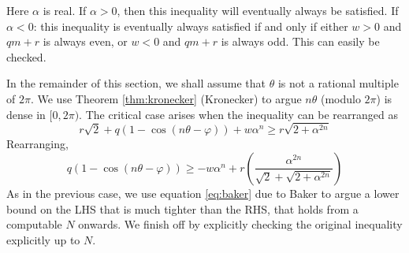 Here $\alpha$ is real. If $\alpha > 0$, then this inequality will eventually always be satisfied. If $\alpha < 0$: this inequality is eventually always satisfied if and only if either $w>0$ and $qm+r$ is always even, or $w<0$ and $qm+r$ is always odd. This can easily be checked.

In the remainder of this section, we shall assume that $\theta$ is not a rational multiple of $2\pi$. We use Theorem \ref{thm:kronecker} (Kronecker) to argue $n\theta$ (modulo $2\pi$) is dense in $[0, 2\pi)$. The critical case arises when the inequality can be rearranged as
\begin{equation}
r\sqrt{2} + q(1 - \cos(n\theta - \varphi)) + w\alpha^n \ge r\sqrt{2 + \alpha^{2n}}
\end{equation}
Rearranging,
\begin{equation}
q(1 - \cos(n\theta - \varphi)) \ge -w\alpha^n + r\left(\frac{\alpha^{2n}}{\sqrt{2}+\sqrt{2 + \alpha^{2n}}}\right)
\end{equation}
As in the previous case, we use equation \ref{eq:baker} due to Baker to argue a lower bound on the LHS that is much tighter than the RHS, that holds from a computable $N$ onwards. We finish off by explicitly checking the original inequality explicitly up to $N$.
